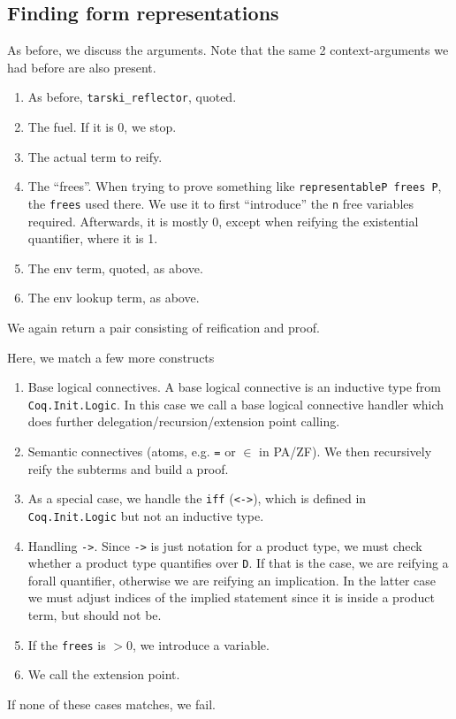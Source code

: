 \documentclass[11pt,a4paper]{article}
\begin{document}
\subsection{Finding form representations}
As before, we discuss the arguments. Note that the same 2 context-arguments we had before are also present.
\begin{enumerate}
\item As before, \lstinline|tarski_reflector|, quoted.
\item The fuel. If it is 0, we stop.
\item The actual term to reify.
\item The \enquote{frees}. When trying to prove something like \lstinline|representableP frees P|, the \lstinline|frees| used there. We use it to first \enquote{introduce} the \lstinline|n| free variables required. Afterwards, it is mostly 0, except when reifying the existential quantifier, where it is 1.
\item The env term, quoted, as above.
\item The env lookup term, as above.
\end{enumerate}
We again return a pair consisting of reification and proof.

Here, we match a few more constructs
\begin{enumerate}
	\item Base logical connectives. A base logical connective is an inductive type from \lstinline|Coq.Init.Logic|. In this case we call a base logical connective handler which does further delegation/recursion/extension point calling.
	\item Semantic connectives (atoms, e.g. \lstinline|=| or $\in$ in PA/ZF). We then recursively reify the subterms and build a proof.
	\item As a special case, we handle the \lstinline|iff| (\lstinline|<->|), which is defined in \lstinline|Coq.Init.Logic| but not an inductive type.
	\item Handling \lstinline|->|. Since \lstinline|->| is just notation for a product type, we must check whether a product type quantifies over \lstinline|D|. If that is the case, we are reifying a forall quantifier, otherwise we are reifying an implication. In the latter case we must adjust indices of the implied statement since it is inside a product term, but should not be.
	\item If the \lstinline|frees| is $>0$, we introduce a variable.
	\item We call the extension point.
\end{enumerate}
If none of these cases matches, we fail.
\end{document}
